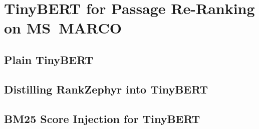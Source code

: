 \section{TinyBERT for Passage Re-Ranking on MS~MARCO}

\subsection{Plain TinyBERT}

\subsection{Distilling RankZephyr into TinyBERT}

\subsection{BM25 Score Injection for TinyBERT}
